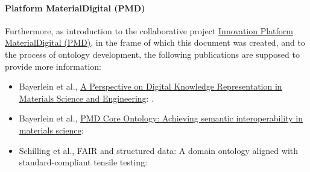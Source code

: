 \paragraph{Platform MaterialDigital (PMD)}


Furthermore, as introduction to the collaborative project \href{http://www.materialdigital.de}{Innovation Platform MaterialDigital (PMD)}, in the frame of which this document was created, and to the process of ontology development, the following publications are supposed to provide more information: 

\begin{itemize}
    \item Bayerlein et al., \href{https://doi.org/10.1002/adem.202101176}{A Perspective on Digital Knowledge Representation in Materials Science and Engineering}: \cite{BayerleinPerspective2022}.
    \item Bayerlein et al., \href{https://doi.org/10.1016/j.matdes.2023.112603}{PMD Core Ontology: Achieving semantic interoperability in materials science}: \cite{BayerleinPMDco2024}
    \item Schilling et al., FAIR and structured data: A domain ontology aligned with standard-compliant tensile testing: \cite{SchillingTTO2023}
\end{itemize}

\newpage